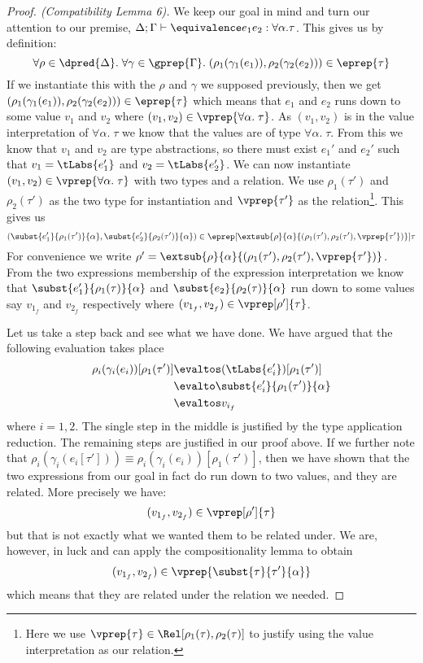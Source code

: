 \begin{proof}[Proof. (Compatibility Lemma 6)]
We keep our goal in mind and turn our attention to our premise, $\Delta; \Gamma \vdash \lreq{e_1}{e_2} : \forall \alpha . \tau$. This gives us by definition:
\[
\forall \rho \in \dpred{\Delta}. \; \forall \gamma \in \gprep{\Gamma}. \; (\rho_1(\gamma_1(e_1)),\rho_2(\gamma_2(e_2))) \in \eprep{\tau}
\]
If we instantiate this with the $\rho$ and $\gamma$ we supposed previously, then we get $(\rho_1(\gamma_1(e_1)),\rho_2(\gamma_2(e_2))) \in \eprep{\tau}$ which means that $e_1$ and $e_2$ runs down to some value $v_1$ and $v_2$ where $(v_1,v_2) \in \vprep{\forall \alpha. \; \tau}$. As $(v_1,v_2)$ is in the value interpretation of $\forall \alpha. \; \tau$ we know that the values are of type $\forall \alpha. \; \tau$. From this we know that $v_1$ and $v_2$ are type abstractions, so there must exist $e_1'$ and $e_2'$ such that $v_1 = \tLabs{e_1'}$ and $v_2 = \tLabs{e_2'}$. We can now instantiate $(v_1,v_2) \in \vprep{\forall \alpha. \; \tau}$ with two types and a relation. We use $\rho_1(\tau')$ and $\rho_2(\tau')$ as the two type for instantiation and $\vprep{\tau'}$ as the relation\footnote{Here we use $\vprep{\tau} \in \Rel[\rho_1(\tau),\rho_2(\tau)]$ to justify using the value interpretation as our relation.}. This gives us
\[
  (\subst{e_1'}{\rho_1(\tau')}{\alpha},\subst{e_2'}{\rho_2(\tau')}{\alpha}) \in \eprep[\extsub{\rho}{\alpha}{(\rho_1(\tau'),\rho_2(\tau'),\vprep{\tau'})}]{\tau}
\]
For convenience we write $\rho' = \extsub{\rho}{\alpha}{(\rho_1(\tau'),\rho_2(\tau'),\vprep{\tau'})}$. From the two expressions membership of the expression interpretation we know that $\subst{e_1'}{\rho_1(\tau)}{\alpha}$ and $\subst{e_2}{\rho_2(\tau)}{\alpha}$ run down to some values say $v_{1_f}$ and $v_{2_f}$ respectively where $(v_{1_f},v_{2_f}) \in \vprep[\rho']{\tau}$.

Let us take a step back and see what we have done. We have argued that the following evaluation takes place
\begin{align*}
  \rho_i (\gamma_i(e_i)) [\rho_1(\tau')] & \evaltos (\tLabs{e_i'})[\rho_1(\tau')] \\
                      & \evalto \subst{e_i'}{\rho_1(\tau')}{\alpha} \\
                      & \evaltos v_{i_f}
\end{align*}
where $i=1,2$. The single step in the middle is justified by the type application reduction. The remaining steps are justified in our proof above. If we further note that $\rho_i (\gamma_i (e_i [\tau'])) \equiv  \rho_i (\gamma_i (e_i))[\rho_1(\tau')]$, then we have shown that the two expressions from our goal in fact do run down to two values, and they are related. More precisely we have:
\[
  (v_{1_f},v_{2_f}) \in \vprep[\rho']{\tau}
\]
but that is not exactly what we wanted them to be related under. We are, however, in luck and can apply the compositionality lemma to obtain
\[
  (v_{1_f},v_{2_f}) \in \vprep{\subst{\tau}{\tau'}{\alpha}}
\]
which means that they are related under the relation we needed.
\end{proof}

